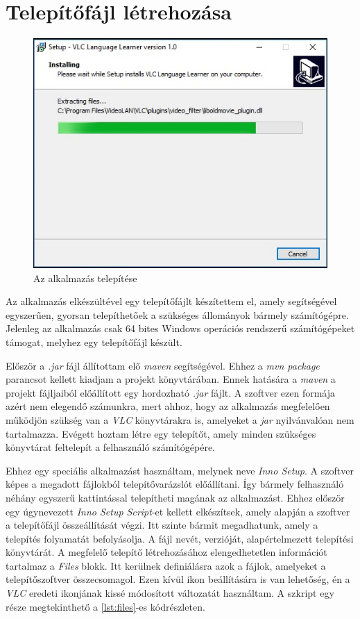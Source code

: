 \section{Telepítőfájl létrehozása}

\begin{figure}[h!]
\centering
  \includegraphics[width=.7\linewidth]{images/installer.jpg}
  \caption{Az alkalmazás telepítése}
  \label{fig:installer}
\end{figure}


Az alkalmazás elkészültével egy telepítőfájlt készítettem el, amely segítségével egyszerűen, gyorsan telepíthetőek a szükséges állományok bármely számítógépre. Jelenleg az alkalmazás csak 64 bites Windows operációs rendszerű számítógépeket támogat, melyhez egy telepítőfájl készült.

Először a \textit{.jar} fájl állítottam elő \textit{maven} segítségével. Ehhez a \textit{mvn package} parancsot kellett kiadjam a projekt könyvtárában. Ennek hatására a \textit{maven} a projekt fájljaiból előállított egy hordozható \textit{.jar} fájlt. A szoftver ezen formája azért nem elegendő számunkra, mert ahhoz, hogy az alkalmazás megfelelően működjön szükség van a \textit{VLC} könyvtárakra is, amelyeket a \textit{jar} nyilvánvalóan nem tartalmazza. Evégett hoztam létre egy telepítőt, amely minden szükséges könyvtárat feltelepít a felhasználó számítógépére.

Ehhez egy speciális alkalmazást használtam, melynek neve \textit{Inno Setup}. A szoftver képes a megadott fájlokból telepítővarázslót előállítani. Így bármely felhasználó néhány egyszerű kattintással telepítheti magának az alkalmazást. Ehhez először egy úgynevezett \textit{Inno Setup Script}-et kellett elkészítsek, amely alapján a szoftver a telepítőfájl összeállítását végzi. Itt szinte bármit megadhatunk, amely a telepítés folyamatát befolyásolja. A fájl nevét, verzióját, alapértelmezett telepítési könyvtárát. A megfelelő telepítő létrehozásához elengedhetetlen információt tartalmaz a \textit{Files} blokk. Itt kerülnek definiálásra azok a fájlok, amelyeket a telepítőszoftver összecsomagol. Ezen kívül ikon beállítására is van lehetőség, én a \textit{VLC} eredeti ikonjának kissé módosított változatát használtam. A szkript egy része megtekinthető a \ref{lst:files}-es kódrészleten.

